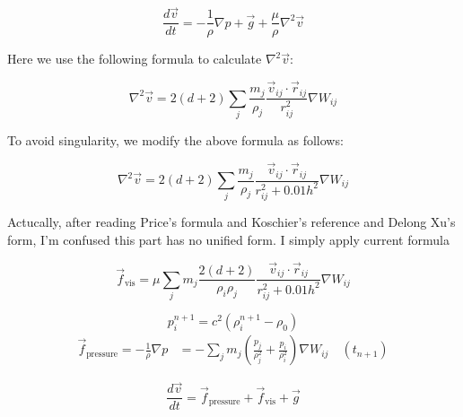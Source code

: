 \begin{frame}
    \begin{equation}
        \frac{d\vec{v}}{dt} = -\frac{1}{\rho}\nabla p+\vec{g} + \frac{\mu}{\rho} \nabla^2 \vec{v}
    \end{equation}
    
    Here we use the following formula to calculate $\nabla^2 \vec{v}$:
    
    \begin{equation}
        \nabla^2 \vec{v} = 2(d+2)\sum_j
        \frac{m_j}{\rho_j}\frac{\vec{v}_{ij}\cdot \vec{r}_{ij}}{r_{ij}^2}\nabla W_{ij}
    \end{equation}
    
    To avoid singularity, we modify the above formula as follows:
    
    \begin{equation}
        \nabla^2 \vec{v} = 2(d+2)\sum_j
        \frac{m_j}{\rho_j}\frac{\vec{v}_{ij}\cdot \vec{r}_{ij}}{r_{ij}^2+0.01h^2}\nabla W_{ij}
    \end{equation}
    
    Actucally, after reading Price's formula and Koschier's reference and Delong Xu's 
    form, I'm confused this part has no unified form. I simply apply current formula
    
    \begin{equation}
        \vec{f}_{\text{vis}}=
        \mu \sum_{j} m_j \frac{2(d+2)}{\rho_i\rho_j}
        \frac{\vec{v}_{ij}\cdot \vec{r}_{ij}}{r_{ij}^2+0.01h^2}\nabla W_{ij}
    \end{equation}
\end{frame}

\begin{frame}
    \begin{equation}
        p_i^{n+1} = c^2 \left(
            \rho_i^{n+1} - \rho_0
        \right)
    \end{equation}
    \begin{equation}
        \begin{aligned}
            \vec{f}_{\text{pressure}}=-\frac{1}{\rho}\nabla p &= 
            -\sum_j m_j \left(
                \frac{p_j}{\rho_j^2}+\frac{p_i}{\rho_i^2}
            \right) \nabla W_{ij}\quad (t_{n+1})
        \end{aligned}
    \end{equation}

    \begin{equation}
        \frac{d\vec{v}}{dt} = 
        \vec{f}_{\text{pressure}}+
        \vec{f}_{\text{vis}}+
        \vec{g}
    \end{equation}
\end{frame}

